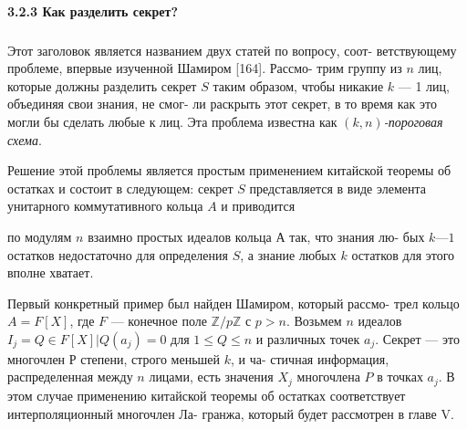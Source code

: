 \documentclass{../template/mai_book}
\begin{document}
\paragraph{3.2.3 Как разделить секрет?}
\subparagraph{} Этот заголовок является названием двух статей по вопросу, соот­-\linebreak
ветствующему проблеме, впервые изученной Шамиром [164]. Рассмо­-\linebreak
трим группу из $n$ лиц, которые должны разделить секрет $S$ таким\linebreak
образом, чтобы никакие $k$ — 1 лиц, объединяя свои знания, не смог-\linebreak­
ли раскрыть этот секрет, в то время как это могли бы сделать любые\linebreak
к лиц. Эта проблема известна как \textit{$(k, n)$-пороговая схема}.\linebreak

Решение этой проблемы является простым применением китайской\linebreak
теоремы об остатках и состоит в следующем: секрет $S$ представляется\linebreak
в виде элемента унитарного коммутативного кольца $A$ и приводится\linebreak

\newpage

\noindent по модулям $n$ взаимно простых идеалов кольца $А$ так, что знания лю-­\linebreak
бых $k — 1$ остатков недостаточно для определения $S$, а знание любых $k$\linebreak
остатков для этого вполне хватает.

Первый конкретный пример был найден Шамиром, который рассмо­-\linebreak
трел кольцо $A = F[X]$, где $F$ — конечное поле $\mathbb{Z}/ p \mathbb{Z}$ с $p > n$. Возьмем\linebreak
$n$ идеалов $I_j = {Q \in F[X] | Q(a_j) = 0}$ для $1\leq Q \leq n$ и различных\linebreak
точек $a_j$. Секрет — это многочлен $Р$ степени, строго меньшей $k$, и ча­-\linebreak
стичная информация, распределенная между $n$ лицами, есть значения\linebreak
$X_j$ многочлена $P$ в точках $a_j$. В этом случае применению китайской\linebreak
теоремы об остатках соответствует интерполяционный многочлен Ла­-\linebreak
гранжа, который будет рассмотрен в главе V.
\end{document}
